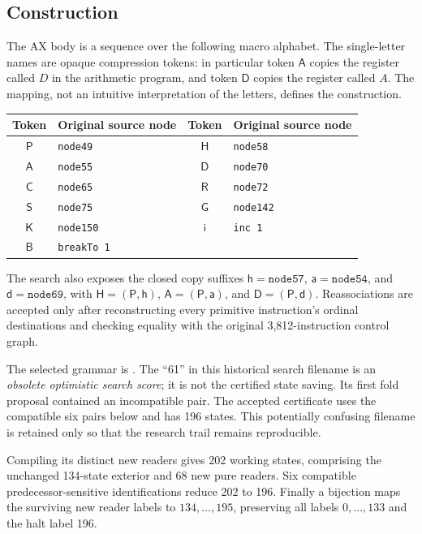 \documentclass[11pt,letterpaper]{article}
\begin{document}
\subsection{Construction}
The AX body is a sequence over the following macro alphabet. The single-letter
names are opaque compression tokens: in particular token $\mathsf A$ copies
the register called $D$ in the arithmetic program, and token $\mathsf D$
copies the register called $A$. The mapping, not an intuitive interpretation
of the letters, defines the construction.
\begin{center}
\begin{tabular}{@{}clcl@{}}
\toprule
Token&Original source node&Token&Original source node\\
\midrule
$\mathsf P$&\texttt{node49}&$\mathsf H$&\texttt{node58}\\
$\mathsf A$&\texttt{node55}&$\mathsf D$&\texttt{node70}\\
$\mathsf C$&\texttt{node65}&$\mathsf R$&\texttt{node72}\\
$\mathsf S$&\texttt{node75}&$\mathsf G$&\texttt{node142}\\
$\mathsf K$&\texttt{node150}&$\mathsf i$&\texttt{inc 1}\\
$\mathsf B$&\texttt{breakTo 1}&&\\
\bottomrule
\end{tabular}
\end{center}
The search also exposes the closed copy suffixes
$\mathsf h=\texttt{node57}$, $\mathsf a=\texttt{node54}$, and
$\mathsf d=\texttt{node69}$, with
$\mathsf H=(\mathsf P,\mathsf h)$,
$\mathsf A=(\mathsf P,\mathsf a)$, and
$\mathsf D=(\mathsf P,\mathsf d)$.
Reassociations are accepted only after reconstructing every primitive
instruction's ordinal destinations and checking equality with the original
3,812-instruction control graph.

The selected grammar is
.
The ``61'' in this historical search filename is an \emph{obsolete optimistic
search score}; it is not the certified state saving. Its first fold proposal
contained an incompatible pair. The accepted certificate uses the compatible
six pairs below and has 196 states. This potentially confusing filename is
retained only so that the research trail remains reproducible.

Compiling its distinct new readers gives 202 working states, comprising the
unchanged 134-state exterior and 68 new pure readers. Six compatible
predecessor-sensitive identifications reduce 202 to 196. Finally a bijection
maps the surviving new reader labels to $134,\ldots,195$, preserving all labels
$0,\ldots,133$ and the halt label 196.
\end{document}
